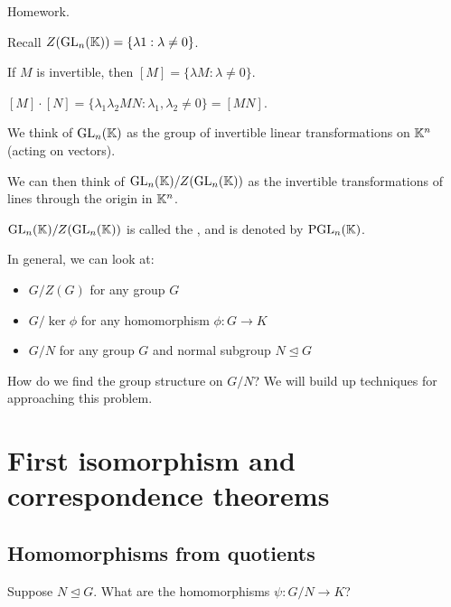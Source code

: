 \documentclass[12pt,letterpaper]{report}
\begin{document}
\begin{ex}[Example: $D_{2n}/Z(D_{2n})$]
  Homework.
\end{ex}

\begin{ex}[Example: $\GL_n(\K)/Z(\GL_n(\K))$]
  Recall $Z(\operatorname{GL}_n(\mathbb{K})) = \{\lambda 1 : \lambda \neq 0\}$.

  If $M$ is invertible, then $[M] = \{\lambda M : \lambda \neq 0\}$.

  $[M] \cdot [N] = \{\lambda_1 \lambda_2 MN : \lambda_1, \lambda_2 \neq 0\} = [MN]$.

  We think of $\operatorname{GL}_n(\mathbb{K})$ as the group of invertible linear transformations on
  $\mathbb{K}^n$ (acting on vectors).

  We can then think of $\GL_n(\K)/Z(\GL_n(\K))$ as the invertible transformations of
  lines through the origin in $\mathbb{K}^n$.

  $\GL_n(\K)/Z(\GL_n(\K))$ is called the ,
  and is denoted by $\operatorname{PGL}_n(\mathbb{K})$.
\end{ex}

In general, we can look at:
\begin{itemize}
  \item $G / Z(G)$ for any group $G$
  \item $G / \ker\phi$ for any homomorphism $\phi \colon G \to K$
  \item $G / N$ for any group $G$ and normal subgroup $N \trianglelefteq G$
\end{itemize}
How do we find the group structure on $G/N$?
We will build up techniques for approaching this problem.

\section{First isomorphism and correspondence theorems}

\subsection{Homomorphisms from quotients}

Suppose $N \trianglelefteq G$.
What are the homomorphisms $\psi \colon G/N \to K$?

\begin{center}
\end{center}
\end{document}
